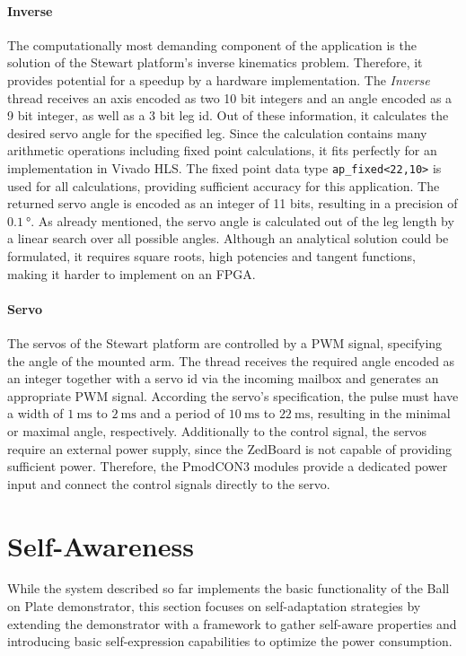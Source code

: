 \paragraph{Inverse} The computationally most demanding component of the
application is the solution of the Stewart platform's inverse kinematics
problem. Therefore, it provides potential for a speedup by a hardware
implementation. The \emph{Inverse} thread receives an axis encoded as two 10
bit integers and an angle encoded as a 9 bit integer, as well as a 3 bit leg
id. Out of these information, it calculates the desired servo angle for the
specified leg. Since the calculation contains many arithmetic operations
including fixed point calculations, it fits perfectly for an implementation in
Vivado HLS. The fixed point data type \lstinline{ap_fixed<22,10>} is used for
all calculations, providing sufficient accuracy for this application. The
returned servo angle is encoded as an integer of 11 bits, resulting in a
precision of $\SI{0.1}{\degree}$. As already mentioned, the servo angle is
calculated out of the leg length by a linear search over all possible angles.
Although an analytical solution could be formulated, it requires square roots,
high potencies and tangent functions, making it harder to implement on an
FPGA.

\paragraph{Servo} The servos of the Stewart platform are controlled by a
\ac{PWM} signal, specifying the angle of the mounted arm. The thread receives
the required angle encoded as an integer together with a servo id via the
incoming mailbox and generates an appropriate \ac{PWM} signal. According the
servo's specification, the pulse must have a width of $\SI{1}{\milli\second}$
to $\SI{2}{\milli\second}$ and a period of $\SI{10}{\milli\second}$ to
$\SI{22}{\milli\second}$, resulting in the minimal or maximal angle,
respectively. Additionally to the control signal, the servos require an
external power supply, since the ZedBoard is not capable of providing
sufficient power. Therefore, the PmodCON3 modules provide a dedicated power
input and connect the control signals directly to the servo.

\section{Self-Awareness}
While the system described so far implements the basic functionality of the
Ball on Plate demonstrator, this section focuses on self-adaptation strategies
by extending the demonstrator with a framework to gather self-aware properties
and introducing basic self-expression capabilities to optimize the power
consumption.

